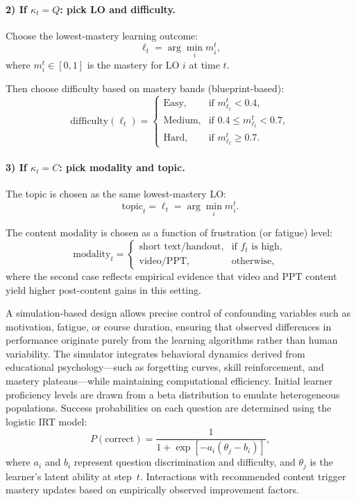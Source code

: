 \documentclass[preprint,12pt]{elsarticle}
\begin{document}
\begin{frontmatter}
\paragraph{2) If $\kappa_t = Q$: pick LO and difficulty.}

Choose the lowest-mastery learning outcome:
\[
\ell_t = \arg \min_i m_i^t,
\]
where $m_i^t \in [0,1]$ is the mastery for LO $i$ at time $t$.

Then choose difficulty based on mastery bands (blueprint-based):
\[
\text{difficulty}(\ell_t) =
\begin{cases}
\text{Easy},   & \text{if } m_{\ell_t}^t < 0.4,\\[4pt]
\text{Medium}, & \text{if } 0.4 \le m_{\ell_t}^t < 0.7,\\[4pt]
\text{Hard},   & \text{if } m_{\ell_t}^t \ge 0.7.
\end{cases}
\]

\paragraph{3) If $\kappa_t = C$: pick modality and topic.}

The topic is chosen as the same lowest-mastery LO:
\[
\text{topic}_t = \ell_t = \arg \min_i m_i^t.
\]

The content modality is chosen as a function of frustration (or fatigue) level:
\[
\text{modality}_t =
\begin{cases}
\text{short text/handout}, & \text{if } f_t \text{ is high},\\[4pt]
\text{video/PPT},          & \text{otherwise},
\end{cases}
\]
where the second case reflects empirical evidence that video and PPT content yield higher post-content gains in this setting.


A simulation-based design allows precise control of confounding variables such as motivation, fatigue, or course duration, ensuring that observed differences in performance originate purely from the learning algorithms rather than human variability.  The simulator integrates behavioral dynamics derived from educational psychology—such as forgetting curves, skill reinforcement, and mastery plateaus—while maintaining computational efficiency.  
Initial learner proficiency levels are drawn from a beta distribution to emulate heterogeneous populations.  
Success probabilities on each question are determined using the logistic IRT model:
\[
P(\text{correct}) = \frac{1}{1+\exp[-a_i(\theta_j - b_i)]},
\]
where $a_i$ and $b_i$ represent question discrimination and difficulty, and $\theta_j$ is the learner’s latent ability at step~$t$.  
Interactions with recommended content trigger mastery updates based on empirically observed improvement factors.


\end{frontmatter}
\end{document}
